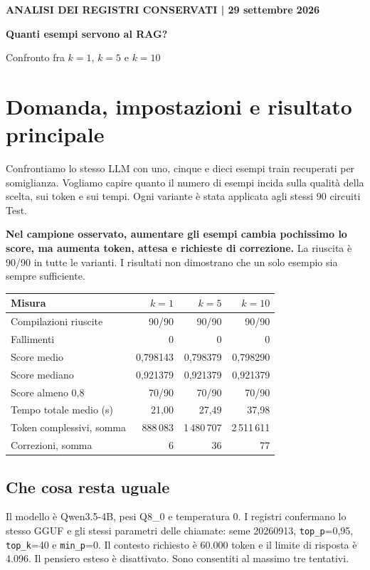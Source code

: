 \documentclass[a4paper,10pt]{article}
\begin{document}
{\small\bfseries ANALISI DEI REGISTRI CONSERVATI | 29 settembre 2026}\par
{\LARGE\bfseries Quanti esempi servono al RAG?}\par
{\Large Confronto fra $k=1$, $k=5$ e $k=10$}\par\medskip
\section{Domanda, impostazioni e risultato principale}
Confrontiamo lo stesso LLM con uno, cinque e dieci esempi train recuperati
per somiglianza. Vogliamo capire quanto il numero di esempi incida sulla
qualità della scelta, sui token e sui tempi. Ogni variante è stata applicata
agli stessi 90 circuiti Test.

\textbf{Nel campione osservato, aumentare gli esempi cambia pochissimo lo score,
ma aumenta token, attesa e richieste di correzione.} La riuscita è 90/90 in tutte
le varianti. I risultati non dimostrano che un solo esempio sia sempre sufficiente.

\begingroup\small\renewcommand{\arraystretch}{1.18}\setlength{\tabcolsep}{5pt}
\begin{tabularx}{\linewidth}{Xrrr}\toprule
Misura & $k=1$ & $k=5$ & $k=10$\\\midrule
Compilazioni riuscite & 90/90 & 90/90 & 90/90\\
Fallimenti & 0 & 0 & 0\\
Score medio & 0,798143 & 0,798379 & 0,798290\\
Score mediano & 0,921379 & 0,921379 & 0,921379\\
Score almeno 0,8 & 70/90 & 70/90 & 70/90\\
Tempo totale medio (s) & 21,00 & 27,49 & 37,98\\
Token complessivi, somma & 888\,083 & 1\,480\,707 & 2\,511\,611\\
Correzioni, somma & 6 & 36 & 77\\
\bottomrule\end{tabularx}\endgroup\par
\subsection{Che cosa resta uguale}
Il modello è Qwen3.5-4B, pesi Q8\_0 e temperatura 0. I registri confermano
lo stesso GGUF e gli stessi parametri delle chiamate: seme 20260913,
\texttt{top\_p}=0,95, \texttt{top\_k}=40 e \texttt{min\_p}=0.
Il contesto richiesto è 60.000 token e il limite di risposta è 4.096.
Il pensiero esteso è disattivato. Sono consentiti al massimo tre tentativi.
\end{document}

